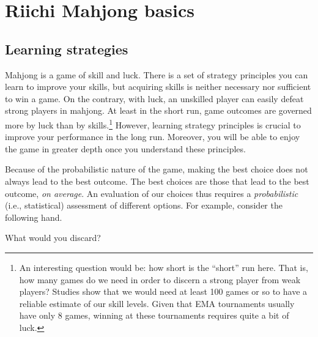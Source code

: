 \chapter{Riichi Mahjong basics}\label{ch:basic}

\section{Learning strategies}

Mahjong is a game of skill and luck. 
There is a set of strategy principles you can learn to improve your skills, but acquiring skills is neither necessary nor sufficient to win a game. On the contrary, with luck, an unskilled player can easily defeat strong players in mahjong. At least in the short run, game outcomes are governed more by luck than by skills.\footnote{An interesting question would be: how short is the ``short'' run here. That is, how many games do we need in order to discern a strong player from weak players? Studies show that we would need at least 100 games or so to have a reliable estimate of our skill levels. Given that EMA tournaments usually have only 8 games, winning at these tournaments requires quite a bit of luck.}
However, learning strategy principles is crucial to improve your performance in the long run. Moreover, you will be able to enjoy the game in greater depth once you understand these principles. 

\bigskip
Because of the probabilistic nature of the game, making the best choice does not always lead to the best outcome. The best choices are those that lead to the best outcome, \emph{on average}. An evaluation of our choices thus requires a \emph{probabilistic} (i.e., statistical) assessment of different options. For example, consider the following hand. 
\vspace{5pt}
\begin{screen}
\bp
{}
\fa\fa\rfa
\ep
\vspace{-10pt}What would you discard? \vspace{-5pt}
\end{screen}

